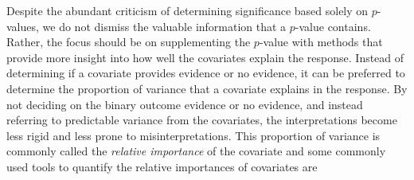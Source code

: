\newline
\newline
Despite the abundant criticism of determining significance based solely on $p$-values, we do not dismiss the valuable information that a $p$-value contains. 
Rather, the focus should be on supplementing the $p$-value with methods that provide more insight into how well the covariates explain the response.
Instead of determining if a covariate provides evidence or no evidence, it can be preferred to determine the proportion of variance that a covariate explains in the response.
By not deciding on the binary outcome evidence or no evidence, and instead referring to predictable variance \citep{johnson_relative_weights} from the covariates, the interpretations become less rigid and less prone to misinterpretations.
This proportion of variance is commonly called the \textit{relative importance} of the covariate and some commonly used tools to quantify the relative importances of covariates are  
